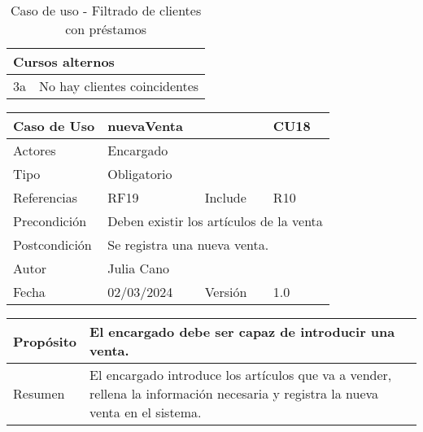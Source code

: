 \begin{table}[H]
	\centering
	\begin{tabular}{| m{} | m{} | m{} | m{} |}
		\hline
		\multicolumn{4}{|m{0.9\textwidth}|}{Cursos alternos}     \\ 
		\hline
		3a & \multicolumn{3}{m{0.67\textwidth}|}{No hay clientes coincidentes} \\ 
		\hline
	\end{tabular}
	\caption{Caso de uso - Filtrado de clientes con préstamos}
\end{table}

\newpage


\begin{table}[H]
	\centering
	\begin{tabular}{| m{} | m{} | m{} | m{}|}
		\hline
		\rowcolor{grayshade} Caso de Uso & \multicolumn{2}{|m{0.43\textwidth}|}{nuevaVenta} &  CU18\\ 
		\hline
		Actores & \multicolumn{3}{l|}{Encargado} \\ 
		\hline
		Tipo & \multicolumn{3}{l|}{Obligatorio} \\ 
		\hline
		Referencias & RF19 & Include & R10 \\ 
		\hline
		Precondición & \multicolumn{3}{m{0.6\textwidth}|}{Deben existir los artículos de la venta} \\ 
		\hline
		Postcondición & \multicolumn{3}{m{0.6\textwidth}|}{Se registra una nueva venta.} \\ 
		\hline
		Autor & \multicolumn{3}{l|}{Julia Cano} \\ 
		\hline
		Fecha & 02/03/2024 & Versión & 1.0 \\
		\hline
	\end{tabular}
\end{table}



\begin{table}[H]
	\centering
	\begin{tabular}{| m{} | m{} | m{} | m{} |}
		\hline
		Propósito & \multicolumn{3}{m{0.67\textwidth}|}{El encargado debe ser capaz de introducir una venta.}  \\ 
		\hline
		Resumen & \multicolumn{3}{m{0.67\textwidth}|}{El encargado introduce los artículos que va a vender, rellena la información necesaria y registra la nueva venta en el sistema.} \\ 
		\hline
	\end{tabular}
\end{table}


